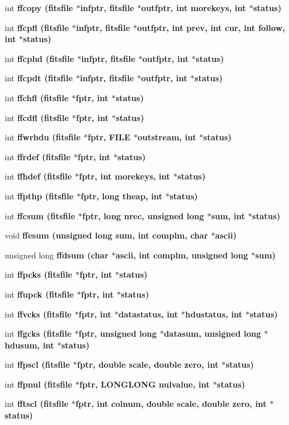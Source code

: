 \begin{CompactItemize}
\item 
int \bf{ffcopy} (\bf{fitsfile} $\ast$infptr, \bf{fitsfile} $\ast$outfptr, int morekeys, int $\ast$status)
\item 
int \bf{ffcpfl} (\bf{fitsfile} $\ast$infptr, \bf{fitsfile} $\ast$outfptr, int prev, int cur, int follow, int $\ast$status)
\item 
int \bf{ffcphd} (\bf{fitsfile} $\ast$infptr, \bf{fitsfile} $\ast$outfptr, int $\ast$status)
\item 
int \bf{ffcpdt} (\bf{fitsfile} $\ast$infptr, \bf{fitsfile} $\ast$outfptr, int $\ast$status)
\item 
int \bf{ffchfl} (\bf{fitsfile} $\ast$fptr, int $\ast$status)
\item 
int \bf{ffcdfl} (\bf{fitsfile} $\ast$fptr, int $\ast$status)
\item 
int \bf{ffwrhdu} (\bf{fitsfile} $\ast$fptr, FILE $\ast$outstream, int $\ast$status)
\item 
int \bf{ffrdef} (\bf{fitsfile} $\ast$fptr, int $\ast$status)
\item 
int \bf{ffhdef} (\bf{fitsfile} $\ast$fptr, int morekeys, int $\ast$status)
\item 
int \bf{ffpthp} (\bf{fitsfile} $\ast$fptr, long theap, int $\ast$status)
\item 
int \bf{ffcsum} (\bf{fitsfile} $\ast$fptr, long nrec, unsigned long $\ast$sum, int $\ast$status)
\item 
void \bf{ffesum} (unsigned long sum, int complm, char $\ast$ascii)
\item 
unsigned long \bf{ffdsum} (char $\ast$ascii, int complm, unsigned long $\ast$sum)
\item 
int \bf{ffpcks} (\bf{fitsfile} $\ast$fptr, int $\ast$status)
\item 
int \bf{ffupck} (\bf{fitsfile} $\ast$fptr, int $\ast$status)
\item 
int \bf{ffvcks} (\bf{fitsfile} $\ast$fptr, int $\ast$datastatus, int $\ast$hdustatus, int $\ast$status)
\item 
int \bf{ffgcks} (\bf{fitsfile} $\ast$fptr, unsigned long $\ast$datasum, unsigned long $\ast$hdusum, int $\ast$status)
\item 
int \bf{ffpscl} (\bf{fitsfile} $\ast$fptr, double scale, double zero, int $\ast$status)
\item 
int \bf{ffpnul} (\bf{fitsfile} $\ast$fptr, \bf{LONGLONG} nulvalue, int $\ast$status)
\item 
int \bf{fftscl} (\bf{fitsfile} $\ast$fptr, int colnum, double scale, double zero, int $\ast$status)

\end{CompactItemize}

